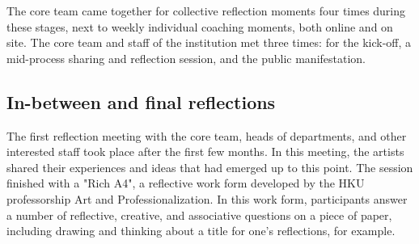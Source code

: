 \documentclass[authordate, empirical]{jote-new-article}
\begin{document}
	The core team came together for collective reflection moments four times during these stages, next to weekly individual coaching moments, both online and on site. The core team and staff of the institution met three times: for the kick-off, a mid-process sharing and reflection session, and the public manifestation.







	\subsection{In-between and final reflections}







	The first reflection meeting with the core team, heads of departments, and other interested staff took place after the first few months. In this meeting, the artists shared their experiences and ideas that had emerged up to this point. The session finished with a "Rich A4", a reflective work form developed by the HKU professorship Art and Professionalization. In this work form, participants answer a number of reflective, creative, and associative questions on a piece of paper, including drawing and thinking about a title for one's reflections, for example.
\end{document}
